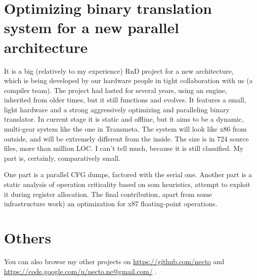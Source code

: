 \documentclass{proc}
\begin{document}
\section*{Optimizing binary translation system for a new parallel architecture}
It is a big (relatively to my experience) RnD project for a new architecture, which is being developed by our hardware people in tight collaboration with us (a compiler team). The project had lasted for several years, using an engine, inherited from older times, but it still functions and evolves. It features a small, light hardware and a strong aggressively optimizing and paralleling binary translator. In current stage it is static and offline, but it aims to be a dynamic, multi-gear system like the one in Transmeta. The system will look like x86 from outside, and will be extremely different from the inside. The size is in 724 source files, more than million LOC. I can't tell much, because it is still classified.
My part is, certainly, comparatively small.

One part is a parallel CFG dumps, factored with the serial one.
Another part is a static analysis of operation criticality based on som heuristics, attempt to exploit it during register allocation.
The final contribution, apart from some infrastructure work) an optimization for x87 floating-point operations.

\section*{Others}
 You can also browse my other projects on \url{https://github.com/necto} and \url{https://code.google.com/u/necto.ne@gmail.com/} .
\end{document}
